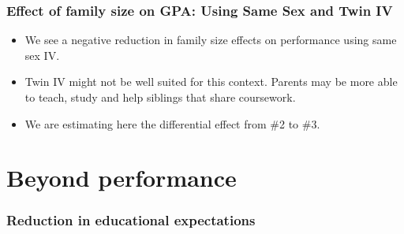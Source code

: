\documentclass{beamer}
\begin{document}
\begin{frame}
    \label{frame:iv_conclusion}
    \frametitle{Effect of family size on GPA: Using Same Sex and Twin IV}
 \begin{itemize}
        \item We see a negative reduction in family size effects on performance using same sex IV.
        \item Twin IV might not be well suited for this context. Parents may be more able to teach, study and help siblings that share coursework. 
        \item We are estimating here the differential effect from \#2 to \#3.
    \end{itemize}
\end{frame}

\section{Beyond performance}

    \begin{frame}
            \label{frame:expectations}
            \frametitle{Reduction in educational expectations}
      {
    }   %
    \end{frame}
\end{document}
